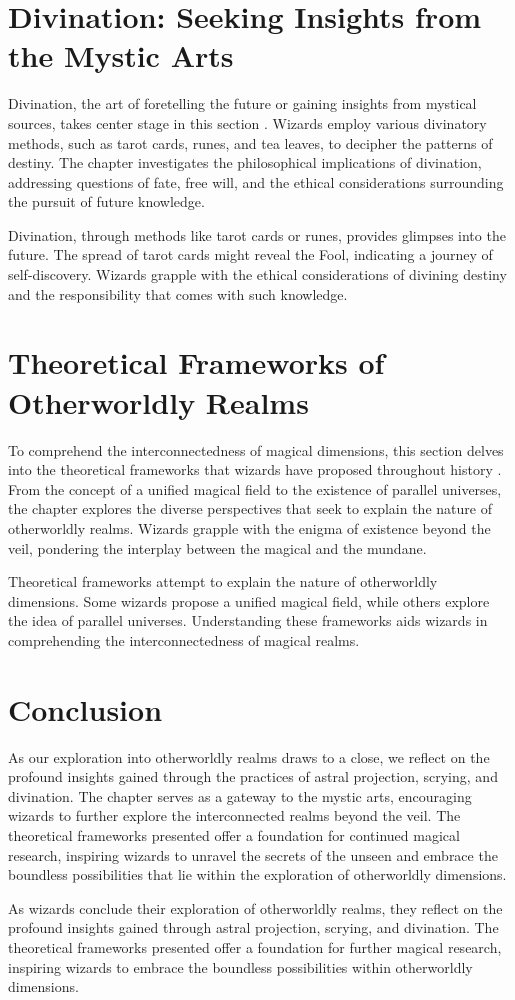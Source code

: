 \section{Divination: Seeking Insights from the Mystic Arts}
Divination, the art of foretelling the future or gaining insights from mystical sources, takes center stage in this section \cite{propheciesanddivination2017}. Wizards employ various divinatory methods, such as tarot cards, runes, and tea leaves, to decipher the patterns of destiny. The chapter investigates the philosophical implications of divination, addressing questions of fate, free will, and the ethical considerations surrounding the pursuit of future knowledge.

Divination, through methods like tarot cards or runes, provides glimpses into the future. The spread of tarot cards might reveal the Fool, indicating a journey of self-discovery. Wizards grapple with the ethical considerations of divining destiny and the responsibility that comes with such knowledge.

\section{Theoretical Frameworks of Otherworldly Realms}
To comprehend the interconnectedness of magical dimensions, this section delves into the theoretical frameworks that wizards have proposed throughout history \cite{theoreticalframeworks2020}. From the concept of a unified magical field to the existence of parallel universes, the chapter explores the diverse perspectives that seek to explain the nature of otherworldly realms. Wizards grapple with the enigma of existence beyond the veil, pondering the interplay between the magical and the mundane.

Theoretical frameworks attempt to explain the nature of otherworldly dimensions. Some wizards propose a unified magical field, while others explore the idea of parallel universes. Understanding these frameworks aids wizards in comprehending the interconnectedness of magical realms.

\section{Conclusion}
As our exploration into otherworldly realms draws to a close, we reflect on the profound insights gained through the practices of astral projection, scrying, and divination. The chapter serves as a gateway to the mystic arts, encouraging wizards to further explore the interconnected realms beyond the veil. The theoretical frameworks presented offer a foundation for continued magical research, inspiring wizards to unravel the secrets of the unseen and embrace the boundless possibilities that lie within the exploration of otherworldly dimensions.

As wizards conclude their exploration of otherworldly realms, they reflect on the profound insights gained through astral projection, scrying, and divination. The theoretical frameworks presented offer a foundation for further magical research, inspiring wizards to embrace the boundless possibilities within otherworldly dimensions.